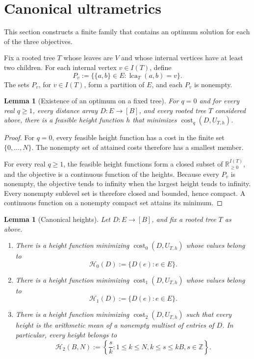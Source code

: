 \documentclass[11pt]{article}
\newtheorem{lemma}[theorem]{Lemma}
\theoremstyle{definition}
\newcommand{\R}{\mathbb{R}}
\newcommand{\Z}{\mathbb{Z}}
\newcommand{\cH}{\mathcal{H}}
\newcommand{\cost}{\operatorname{cost}}
\newcommand{\lca}{\operatorname{lca}}
\begin{document}
\section{Canonical ultrametrics}\label{sec:canonical}

This section constructs a finite family that contains an optimum solution for
each of the three objectives.

Fix a rooted tree \(T\) whose leaves are \(V\) and whose internal vertices
have at least two children.  For each internal vertex \(v\in I(T)\), define
\[
 P_v:=\bigl\{\{a,b\}\in E:\lca_T(a,b)=v\bigr\}.
\]
The sets \(P_v\), for \(v\in I(T)\), form a partition of \(E\), and each
\(P_v\) is nonempty.

\begin{lemma}[Existence of an optimum on a fixed tree]
\label{lem:existence-fixed-tree}
For \(q=0\) and for every real \(q\ge1\), every distance array
\(D:E\to[B]\), and every rooted tree \(T\) considered above, there is a
feasible height function \(h\) that minimizes
\(\cost_q(D,U_{T,h})\).
\end{lemma}

\begin{proof}
For \(q=0\), every feasible height function has a cost in the finite set
\(\{0,\ldots,N\}\).  The nonempty set of attained costs therefore has a
smallest member.

For every real \(q\ge1\), the feasible height functions form a closed subset
of \(\R_{\ge0}^{I(T)}\), and the objective is a continuous function of the
heights.  Because every \(P_v\) is nonempty, the objective tends to infinity
when the largest height tends to infinity.
Every nonempty sublevel set is therefore closed and bounded, hence compact.
A continuous function on a nonempty compact set attains its minimum.
\end{proof}

\begin{lemma}[Canonical heights]\label{lem:canonical-heights}
Let \(D:E\to[B]\), and fix a rooted tree \(T\) as above.

\begin{enumerate}
\item There is a height function minimizing
\(\cost_0(D,U_{T,h})\) whose values belong to
\[
 \cH_0(D):=\{D(e):e\in E\}.
\]

\item There is a height function minimizing
\(\cost_1(D,U_{T,h})\) whose values belong to
\[
 \cH_1(D):=\{D(e):e\in E\}.
\]

\item There is a height function minimizing
\(\cost_2(D,U_{T,h})\) such that every height is the arithmetic mean of a
nonempty multiset of entries of \(D\).  In particular, every height belongs to
\[
 \cH_2(B,N):=
 \left\{\frac{s}{k}:
  1\le k\le N,
  k\le s\le kB,
  s\in\Z
 \right\}.
\]
\end{enumerate}
\end{lemma}
\end{document}
